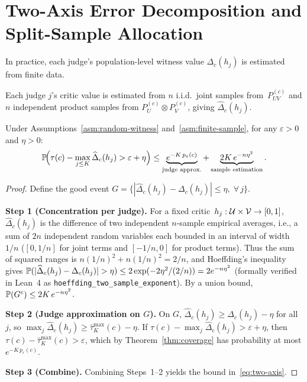 \section{Two-Axis Error Decomposition and Split-Sample Allocation}
\label{sec:two-axis}

In practice, each judge's population-level witness value $\Delta_c(h_j)$ is
estimated from finite data.

\begin{assumption}
\label{asm:finite-sample}
Each judge $j$'s critic value is estimated from $n$ i.i.d.\ joint samples
from~$P^{(c)}_{UV}$ and $n$ independent product samples from
$P^{(c)}_U \otimes P^{(c)}_V$, giving $\widehat\Delta_c(h_j)$.
\end{assumption}

\begin{theorem}
\label{thm:two-axis}
Under Assumptions~\ref{asm:random-witness} and~\ref{asm:finite-sample},
for any $\varepsilon > 0$ and $\eta > 0$:
\begin{equation}
\label{eq:two-axis}
\mathbb{P}\!\Big(\tau(c) - \max_{j \le K} \widehat\Delta_c(h_j)
> \varepsilon + \eta\Big)
\le \underbrace{e^{-K\,p_\varepsilon(c)}}_{\text{judge approx.}}
 + \underbrace{2K\,e^{-n\eta^2}}_{\text{sample estimation}}.
\end{equation}
\end{theorem}

\begin{proof}
Define the good event $G = \{|\widehat\Delta_c(h_j) - \Delta_c(h_j)| \le \eta,
\;\forall\, j\}$.

\textbf{Step 1 (Concentration per judge).}
For a fixed critic~$h_j : \mathcal{U} \times \mathcal{V} \to [0,1]$, $\widehat\Delta_c(h_j)$
is the difference of two independent $n$-sample empirical averages, i.e., a sum
of $2n$ independent random variables each bounded in an interval of width $1/n$
($[0, 1/n]$ for joint terms and $[-1/n, 0]$ for product terms). Thus the sum of
squared ranges is $n(1/n)^2 + n(1/n)^2 = 2/n$, and Hoeffding's inequality
gives $\mathbb{P}(|\widehat\Delta_c(h_j) - \Delta_c(h_j)| > \eta) \le
2\exp(-2\eta^2 / (2/n)) = 2e^{-n\eta^2}$ (formally verified in Lean~4 as
\texttt{hoeffding\_two\_sample\_exponent}). By a union bound,
$\mathbb{P}(G^c) \le 2K\,e^{-n\eta^2}$.

\textbf{Step 2 (Judge approximation on $G$).}
On $G$, $\widehat\Delta_c(h_j) \ge \Delta_c(h_j) - \eta$ for all~$j$, so
$\max_j \widehat\Delta_c(h_j) \ge \hat\tau^{\max}_K(c) - \eta$.
If $\tau(c) - \max_j \widehat\Delta_c(h_j) > \varepsilon + \eta$,
then $\tau(c) - \hat\tau^{\max}_K(c) > \varepsilon$, which by
Theorem~\ref{thm:coverage} has probability at most $e^{-K\,p_\varepsilon(c)}$.

\textbf{Step 3 (Combine).}
Combining Steps~1--2 yields the bound in~\eqref{eq:two-axis}. \qedhere
\end{proof}

